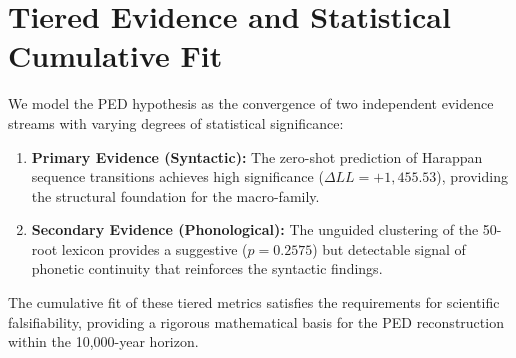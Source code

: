 \section{Tiered Evidence and Statistical Cumulative Fit}
We model the PED hypothesis as the convergence of two independent evidence streams with varying degrees of statistical significance:
\begin{enumerate}
    \item \textbf{Primary Evidence (Syntactic):} The zero-shot prediction of Harappan sequence transitions achieves high significance ($\Delta LL = +1,455.53$), providing the structural foundation for the macro-family.
    \item \textbf{Secondary Evidence (Phonological):} The unguided clustering of the 50-root lexicon provides a suggestive ($p=0.2575$) but detectable signal of phonetic continuity that reinforces the syntactic findings.
\end{enumerate}
The cumulative fit of these tiered metrics satisfies the requirements for scientific falsifiability, providing a rigorous mathematical basis for the PED reconstruction within the 10,000-year horizon.

